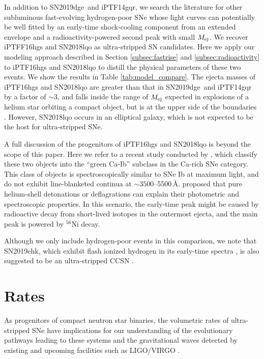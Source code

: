\documentclass[twocolumn]{aastex63}
\newcommand{\name}{SN2019dge}
\begin{document}
\begin{CJK*}{UTF8}{gbsn}
In addition to \name\ and iPTF14gqr, we search the literature for other subluminous fast-evolving 
hydrogen-poor SNe whose light curves can potentially be well fitted by an early-time shock-cooling 
component from an extended envelope and a radioactivity-powered second peak with small $M_{\rm 
ej}$. We recover iPTFF16hgs \citep{DeKC2018} and SN2018lqo \citep{De2020b} as ultra-stripped SN
candidates. Here we apply our modeling approach described in Section \ref{subsec:fastrise} and 
\ref{subsec:radioactivity} to iPTF16hgs and SN2018lqo to distill the physical parameters of these two 
events. We show the results in Table \ref{tab:model_compare}. The ejecta masses of 
iPTF16hgs and SN2018lqo are greater than that in \name\ and iPTF14gqr by a factor of $\sim3$, 
and falls inside the range of $M_{\rm ej}$ expected in explosions of a helium star orbiting a compact 
object, but is at the upper side of the boundaries \citep{Tauris2015}. However, SN2018lqo occurs in an 
elliptical galaxy, which is not expected to be the host for ultra-stripped SNe.

A full discussion of the progenitors of iPTF16hgs and SN2018lqo is beyond the scope of this paper. 
Here we refer to a recent study conducted by \citet{De2020b}, which classify these two objects into 
the ``green Ca-Ib'' subclass in the Ca-rich SNe category. This class of objects is spectroscopically 
similar to SNe Ib at maximum light, and do not exhibit line-blanketed continua at 
$\sim3500$--5500\,\AA. \citet{De2020b} proposed that pure helium-shell detonations or deflagrations 
can explain their photometric and spectroscopic properties. In this scenario, the early-time peak might 
be caused by radioactive decay from short-lived isotopes in the outermost ejecta, and the main 
peak is powered by $^{56}$Ni decay.

Although we only include hydrogen-poor events in this comparison, we note that SN2019ehk, which 
exhibit flash ionized hydrogen in its early-time spectra \citep{Jacobson-Galan2020}, is also suggested 
to be an ultra-stripped CCSN \citep{Nakaoka2020}.

\section{Rates} \label{sec:rates}
As progenitors of compact neutron star binaries, the volumetric rates 
of ultra-stripped SNe have implications for our understanding of the evolutionary pathways leading to 
these systems and the gravitational waves detected by existing and upcoming facilities such as 
LIGO/VIRGO \citep{GW170817}. 


\end{CJK*}
\end{document}

